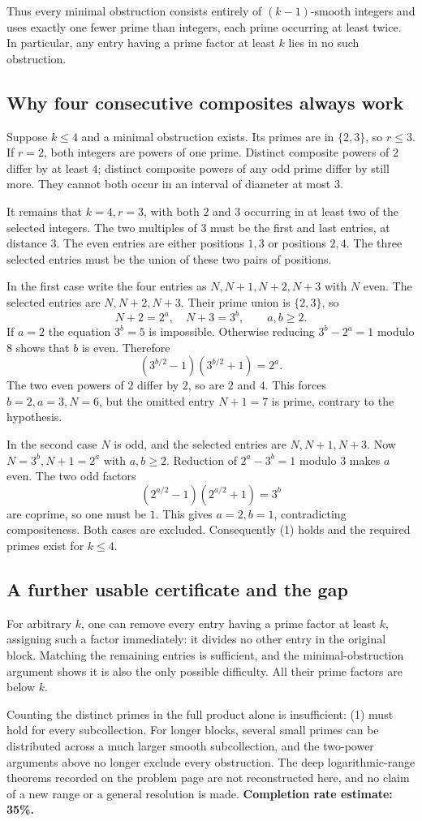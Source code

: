 Thus every minimal obstruction consists entirely of $(k-1)$-smooth integers and uses exactly one fewer prime than integers, each prime occurring at least twice. In particular, any entry having a prime factor at least $k$ lies in no such obstruction.

\subsection*{Why four consecutive composites always work}
Suppose $k\le4$ and a minimal obstruction exists. Its primes are in $\{2,3\}$, so $r\le3$. If $r=2$, both integers are powers of one prime. Distinct composite powers of $2$ differ by at least $4$; distinct composite powers of any odd prime differ by still more. They cannot both occur in an interval of diameter at most $3$.

It remains that $k=4,r=3$, with both $2$ and $3$ occurring in at least two of the selected integers. The two multiples of $3$ must be the first and last entries, at distance $3$. The even entries are either positions $1,3$ or positions $2,4$. The three selected entries must be the union of these two pairs of positions.

In the first case write the four entries as $N,N+1,N+2,N+3$ with $N$ even. The selected entries are $N,N+2,N+3$. Their prime union is $\{2,3\}$, so
\[
 N+2=2^a,\quad N+3=3^b,\qquad a,b\ge2.
\]
If $a=2$ the equation $3^b=5$ is impossible. Otherwise reducing $3^b-2^a=1$ modulo $8$ shows that $b$ is even. Therefore
\[
 (3^{b/2}-1)(3^{b/2}+1)=2^a.
\]
The two even powers of $2$ differ by $2$, so are $2$ and $4$. This forces $b=2,a=3,N=6$, but the omitted entry $N+1=7$ is prime, contrary to the hypothesis.

In the second case $N$ is odd, and the selected entries are $N,N+1,N+3$. Now $N=3^b,N+1=2^a$ with $a,b\ge2$. Reduction of $2^a-3^b=1$ modulo $3$ makes $a$ even. The two odd factors
\[
 (2^{a/2}-1)(2^{a/2}+1)=3^b
\]
are coprime, so one must be $1$. This gives $a=2,b=1$, contradicting compositeness. Both cases are excluded. Consequently (1) holds and the required primes exist for $k\le4$.

\subsection*{A further usable certificate and the gap}
For arbitrary $k$, one can remove every entry having a prime factor at least $k$, assigning such a factor immediately: it divides no other entry in the original block. Matching the remaining entries is sufficient, and the minimal-obstruction argument shows it is also the only possible difficulty. All their prime factors are below $k$.

Counting the distinct primes in the full product alone is insufficient: (1) must hold for every subcollection. For longer blocks, several small primes can be distributed across a much larger smooth subcollection, and the two-power arguments above no longer exclude every obstruction. The deep logarithmic-range theorems recorded on the problem page are not reconstructed here, and no claim of a new range or a general resolution is made.
\textbf{Completion rate estimate: 35\%.}
